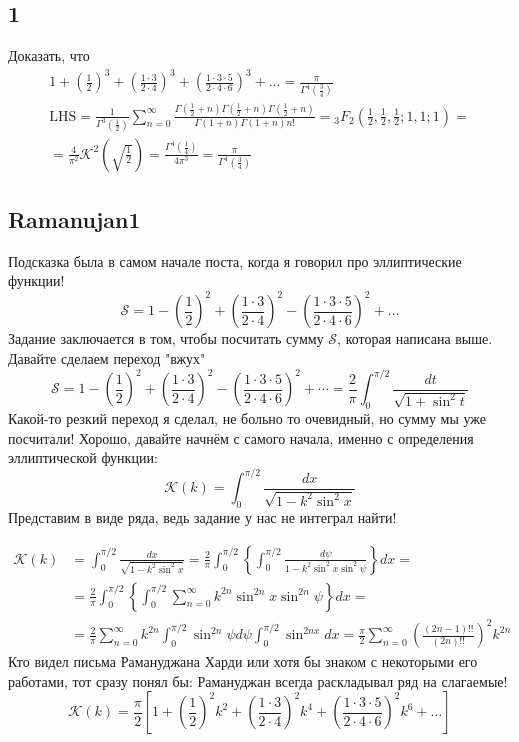 	\subsection{1}
	Доказать, что
	$$
	\begin{gathered}
		1+\left(\frac{1}{2}\right)^3+\left(\frac{1 \cdot 3}{2 \cdot 4}\right)^3+\left(\frac{1 \cdot 3 \cdot 5}{2 \cdot 4 \cdot 6}\right)^3+\ldots=\frac{\pi}{\Gamma^4\left(\frac{3}{4}\right)} \\
		\mathrm{LHS}=\frac{1}{\Gamma^3\left(\frac{1}{2}\right)} \sum_{n=0}^{\infty} \frac{\Gamma\left(\frac{1}{2}+n\right) \Gamma\left(\frac{1}{2}+n\right) \Gamma\left(\frac{1}{2}+n\right)}{\Gamma(1+n) \Gamma(1+n) n !}={ }_3 F_2\left(\frac{1}{2}, \frac{1}{2}, \frac{1}{2} ; 1,1 ; 1\right)= \\
		=\frac{4}{\pi^2} \mathcal{K}^2\left(\sqrt{\frac{1}{2}}\right)=\frac{\Gamma^4\left(\frac{1}{4}\right)}{4 \pi^3}=\frac{\pi}{\Gamma^4\left(\frac{3}{4}\right)}
	\end{gathered}
	$$
	
	\subsection{Ramanujan1}
	
	Подсказка была в самом начале поста, когда я говорил про эллиптические функции!
	$$
	\mathcal{S}=1-\left(\frac{1}{2}\right)^2+\left(\frac{1 \cdot 3}{2 \cdot 4}\right)^2-\left(\frac{1 \cdot 3 \cdot 5}{2 \cdot 4 \cdot 6}\right)^2+\ldots
	$$
	Задание заключается в том, чтобы посчитать сумму $\mathcal{S}$, которая написана выше. Давайте сделаем переход "вжух"
	$$
	\mathcal{S}=1-\left(\frac{1}{2}\right)^2+\left(\frac{1 \cdot 3}{2 \cdot 4}\right)^2-\left(\frac{1 \cdot 3 \cdot 5}{2 \cdot 4 \cdot 6}\right)^2+\cdots=\frac{2}{\pi} \int_0^{\pi / 2} \frac{d t}{\sqrt{1+\sin ^2 t}}
	$$
	Какой-то резкий переход я сделал, не больно то очевидный, но сумму мы уже посчитали! Хорошо, давайте начнём с самого начала, именно с определения эллиптической функции:
	$$
	\mathcal{K}(k)=\int_0^{\pi / 2} \frac{d x}{\sqrt{1-k^2 \sin ^2 x}}
	$$
	Представим в виде ряда, ведь задание у нас не интеграл найти!
	
	$$
	\begin{aligned}
		\mathcal{K}(k) & =\int_0^{\pi / 2} \frac{d x}{\sqrt{1-k^2 \sin ^2 x}}=\frac{2}{\pi} \int_0^{\pi / 2}\left\{\int_0^{\pi / 2} \frac{d \psi}{1-k^2 \sin ^2 x \sin ^2 \psi}\right\} d x= \\
		& =\frac{2}{\pi} \int_0^{\pi / 2}\left\{\int_0^{\pi / 2} \sum_{n=0}^{\infty} k^{2 n} \sin ^{2 n} x \sin ^{2 n} \psi\right\} d x= \\
		& =\frac{2}{\pi} \sum_{n=0}^{\infty} k^{2 n} \int_0^{\pi / 2} \sin ^{2 n} \psi d \psi \int_0^{\pi / 2} \sin ^{2 n x} d x=\frac{\pi}{2} \sum_{n=0}^{\infty}\left(\frac{(2 n-1) ! !}{(2 n) ! !}\right)^2 k^{2 n}
	\end{aligned}
	$$
	Кто видел письма Рамануджана Харди или хотя бы знаком с некоторыми его работами, тот сразу понял бы: Рамануджан всегда раскладывал ряд на слагаемые!
	$$
	\mathcal{K}(k)=\frac{\pi}{2}\left[1+\left(\frac{1}{2}\right)^2 k^2+\left(\frac{1 \cdot 3}{2 \cdot 4}\right)^2 k^4+\left(\frac{1 \cdot 3 \cdot 5}{2 \cdot 4 \cdot 6}\right)^2 k^6+\ldots\right]
	$$
	
